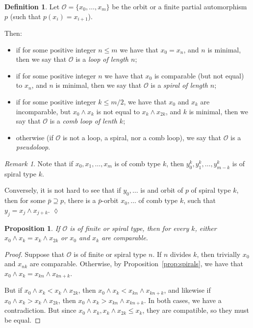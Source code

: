 \documentclass[final,a4paper,12pt,reqno]{amsart}
\newcommand{\meet}{\mathop{\wedge}}
\newtheorem{prop}[thm]{Proposition}
\theoremstyle{remark}
\newtheorem{rem}[thm]{Remark}
\theoremstyle{definition}
\newtheorem{dfn}[thm]{Definition}
\newcommand{\xqed}[1]{%
	\leavevmode\unskip\penalty9999 \hbox{}\nobreak\hfill
	\quad\hbox{\ensuremath{#1}}}
\let \leq \leqslant
\begin{document}
	\begin{dfn}
		Let $\mathcal O=\{x_0,\ldots, x_m\}$ be the orbit or a finite partial automorphism $p$ (such that $p(x_i)=x_{i+1}$).
		
		Then:
		\begin{itemize}
			\item
			if for some positive integer $n\leq m$ we have that $x_0=x_n$, and $n$ is minimal, then we say that $\mathcal O$ is a \emph{loop of length $n$};
			\item 
			if for some positive integer $n$ we have that $x_0$ is comparable (but not equal) to $x_n$, and $n$ is minimal, then we say that $\mathcal O$ is a \emph{spiral of length $n$};
			\item
			if for some positive integer $k\leq m/2$, we have that $x_0$ and $x_k$ are incomparable, but $x_0\meet x_k$ is not equal to $x_k\meet x_{2k}$, and $k$ is minimal, then we say that $\mathcal O$ is a \emph{comb loop of lenth $k$};
			\item
			otherwise (if $\mathcal O$ is not a loop, a spiral, nor a comb loop), we say that $\mathcal O$ is a \emph{pseudoloop}.
		\end{itemize}
	\end{dfn}
	
	\begin{rem}
		Note that if $x_0,x_1,\ldots, x_m$ is of comb type $k$, then $y^k_0,y^k_1,\ldots, y^k_{m-k}$ is of spiral type $k$.
		
		Conversely, it is not hard to see that if $y_0,\ldots$ is and orbit of $p$ of spiral type $k$, then for some $\bar p\supseteq p$, there is a $\bar p$-orbit $x_0,\ldots$ of comb type $k$, such that $y_j=x_j\meet x_{j+k}$.\xqed{\lozenge}
	\end{rem}
	
	\begin{prop}
		\label{prop:finite_spiral_not_comb}
		If $\mathcal O$ is of finite or spiral type, then for every $k$, either $x_0\meet x_k=x_k\meet x_{2k}$ or $x_0$ and $x_k$ are comparable.
	\end{prop}
	\begin{proof}
		Suppose that $\mathcal O$ is of finite or spiral type $n$. If $n$ divides $k$, then trivially $x_0$ and $x_{nk}$ are comparable. Otherwise, by Proposition~\ref{prop:spirals}, we have that $x_0\meet x_k=x_{kn}\meet x_{kn+k}$.
		
		But if $x_0\meet x_k<x_k\meet x_{2k}$, then $x_0\meet x_k<x_{kn}\meet x_{kn+k}$, and likewise if $x_0\meet x_k>x_k\meet x_{2k}$, then $x_0\meet x_k>x_{kn}\meet x_{kn+k}$. In both cases, we have a contradiction. But since $x_0\meet x_k, x_k\meet x_{2k}\leq x_k$, they are compatible, so they must be equal.
	\end{proof}
	
\end{document}

